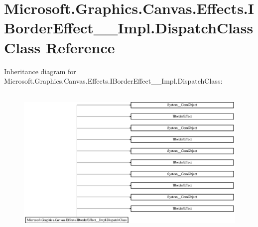\hypertarget{class_microsoft_1_1_graphics_1_1_canvas_1_1_effects_1_1_i_border_effect_____impl_1_1_dispatch_class}{}\section{Microsoft.\+Graphics.\+Canvas.\+Effects.\+I\+Border\+Effect\+\_\+\+\_\+\+Impl.\+Dispatch\+Class Class Reference}
\label{class_microsoft_1_1_graphics_1_1_canvas_1_1_effects_1_1_i_border_effect_____impl_1_1_dispatch_class}
Inheritance diagram for Microsoft.\+Graphics.\+Canvas.\+Effects.\+I\+Border\+Effect\+\_\+\+\_\+\+Impl.\+Dispatch\+Class\+:\begin{figure}[H]
\begin{center}
\leavevmode
\includegraphics[height=7.386091cm]{class_microsoft_1_1_graphics_1_1_canvas_1_1_effects_1_1_i_border_effect_____impl_1_1_dispatch_class}
\end{center}
\end{figure}
